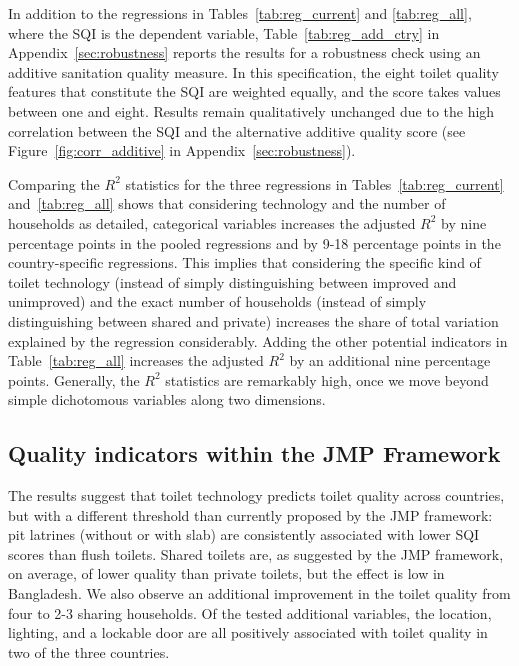 \documentclass[natbib]{svjour3}                     %
\begin{document}
In addition to the regressions in Tables~\ref{tab:reg_current} and \ref{tab:reg_all}, where the SQI is the dependent variable, Table~\ref{tab:reg_add_ctry} in  Appendix~\ref{sec:robustness} reports the results for a robustness check using an additive sanitation quality measure. In this specification, the eight toilet quality features that constitute the SQI are weighted equally, and the score takes values between one and eight. Results remain qualitatively unchanged due to the high correlation between the SQI and the alternative additive quality score (see Figure~\ref{fig:corr_additive} in Appendix~\ref{sec:robustness}).

Comparing the $R^2$ statistics for the three regressions in Tables~\ref{tab:reg_current} and~\ref{tab:reg_all} shows that considering technology and the number of households as detailed, categorical variables increases the adjusted $R^2$ by nine percentage points in the pooled regressions and by 9-18 percentage points in the country-specific regressions. This implies that considering the specific kind of toilet technology (instead of simply distinguishing between improved and unimproved) and the exact number of households (instead of simply distinguishing between shared and private) increases the share of total variation explained by the regression considerably. Adding the other potential indicators in Table~\ref{tab:reg_all} increases the adjusted $R^2$ by an additional nine percentage points. Generally, the $R^2$ statistics are remarkably high, once we move beyond simple dichotomous variables along two dimensions. 

\subsection{Quality indicators within the JMP Framework}

The results suggest that toilet technology predicts toilet quality across countries, but with a different threshold than currently proposed by the JMP framework: pit latrines (without or with slab) are consistently associated with lower SQI scores than flush toilets. Shared toilets are, as suggested by the JMP framework, on average, of lower quality than private toilets, but the effect is low in Bangladesh. We also observe an additional improvement in the toilet quality from four to 2-3 sharing households. Of the tested additional variables, the location, lighting, and a lockable door are all positively associated with toilet quality in two of the three countries.
\end{document}
